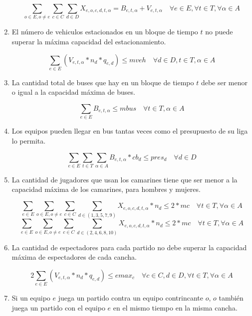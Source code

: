 \begin{enumerate}
        \[\sum_{o\in E, o\neq e}\sum_{c\in C}\sum_{d\in D}X_{e,o,c,d,t,\alpha} = B_{e,t,\alpha} + V_{e,t,\alpha} \quad \forall e\in E, \forall t\in T, \forall \alpha\in A \]
    
    \item El número de vehiculos estacionados en un bloque de tiempo $t$ no puede superar la máxima capacidad del estacionamiento.
    
        \[\sum_{e\in E}{(V_{e,t,\alpha}*n_{d}*q_{e,d})}\leq mveh \quad \forall d\in D, t\in T, \alpha\in A\]       
    

    \item La cantidad total de buses que hay en un bloque de tiempo $t$ debe ser menor o igual a la capacidad máxima de buses.
    
        \[\sum_{e\in E}{B_{e,t,\alpha}}\leq mbus \quad \forall t\in T, \alpha\in A\]     
        
    \item Los equipos pueden llegar en bus tantas veces como el presupuesto de su liga lo permita.
    
        \[\sum_{e\in E}\sum_{t\in T}\sum_{\alpha \in A}{B_{e,t,\alpha}} * cb_ {d}\leq pres_{d}\quad \forall d\in D\]     
        
    \item La cantidad de jugadores que usan los camarines tiene que ser menor a la capacidad máxima de los camarines, para hombres y mujeres.
    
        \[\sum_{e\in E}\sum_{o\in E,o\neq e}\sum_{c\in C}\sum_{d\in (1,3,5,7,9)}{X_{e,o,c,d,t,\alpha}*n_{d}} \leq 2*mc \quad \forall t\in T, \forall \alpha\in A\]
        \[\sum_{e\in E}\sum_{o\in E,o\neq e}\sum_{c\in C}\sum_{d\in (2,4,6,8,10)}{X_{e,o,c,d,t,\alpha}*n_{d}} \leq 2*mc \quad \forall t\in T, \forall \alpha\in A\]
        
    \item La cantidad de espectadores para cada partido no debe superar la capacidad máxima de espectadores de cada cancha.

      \[2\sum_{e\in E}{(V_{e,t,\alpha}*n_{d}*q_{e,d})}  \leq emax_{c} \quad \forall c \in C, d\in D, \forall t \in T,\forall \alpha \in A\]
    
    \item Si un equipo $e$ juega un partido contra un equipo contrincante $o$, $o$ también juega un partido con el equipo $e$ en el mismo tiempo en la misma cancha.
    

\end{enumerate}
